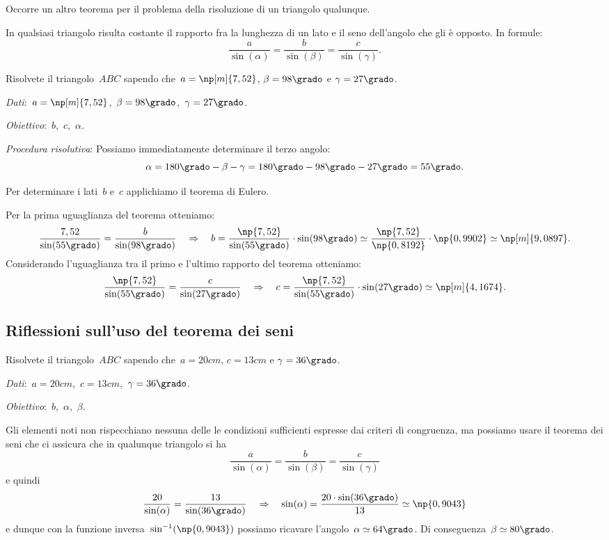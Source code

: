 Occorre un altro teorema per il problema della risoluzione di un triangolo qualunque.

\begin{teorema}
In qualsiasi triangolo risulta costante il rapporto fra la lunghezza di un lato e il seno dell'angolo che gli è opposto. In formule:
\[\frac{a}{\sin(\alpha)}=\frac{b}{\sin(\beta)}=\frac{c}{\sin(\gamma)}.\]
\end{teorema}

\begin{problema}
Risolvete il triangolo~$ABC$ sapendo che~$a= \np[m]{7,52}$, $\beta=98\grado$ e $\gamma=27\grado$.
\end{problema}

\emph{Dati}:~$a= \np[m]{7,52}$,\quad~$\beta=98\grado$,\quad~$\gamma=27\grado$.

\emph{Obiettivo}:~$b$,\quad~$c$,\quad~$\alpha$.

\emph{Procedura risolutiva}:
Possiamo immediatamente determinare il terzo angolo: \[\alpha=180\grado-\beta-\gamma=180\grado-98\grado-27\grado=55\grado.\]

Per determinare i lati~$b$ e~$c$ applichiamo il teorema di Eulero.

Per la prima uguaglianza del teorema otteniamo:
\[
\frac{7,52}{\sin(55\grado)}=\frac{b}{\sin(98\grado)} \quad\Rightarrow\quad b=\frac{\np{7,52}}{\sin(55\grado)}\cdot \sin(98\grado)\simeq
\frac{\np{7,52}}{\np{0,8192}}\cdot \np{0,9902}\simeq\np[m]{9,0897}.
\]
Considerando l'uguaglianza tra il primo e l'ultimo rapporto del teorema otteniamo:
\[
\frac{\np{7,52}}{\sin(55\grado)}=\frac{c}{\sin(27\grado)} \quad\Rightarrow\quad c=\frac{\np{7,52}}{\sin(55\grado)}\cdot \sin(27\grado)\simeq\np[m]{4,1674}.
\]

\subsection{Riflessioni sull'uso del teorema dei seni}

\begin{problema}
Risolvete il triangolo~$ABC$ sapendo che~$a= 20\unit{cm}$, $c= 13\unit{cm}$ e $\gamma=36\grado$.
\end{problema}

\emph{Dati}:~$a=20\unit{cm}$,\quad~$c=13\unit{cm}$,\quad~$\gamma=36\grado$.

\emph{Obiettivo}:~$b$,\quad~$\alpha$,\quad~$\beta$.

Gli elementi noti non rispecchiano nessuna delle le condizioni sufficienti espresse dai criteri di congruenza, ma possiamo usare il teorema dei seni
che ci assicura che in qualunque triangolo si ha
 \[\frac{a}{\sin(\alpha)}=\frac{b}{\sin(\beta)}=\frac{c}{\sin(\gamma)}\]
e quindi
\[\frac{20}{\sin(\alpha)}=\frac{13}{\sin(36\grado)}\quad\Rightarrow\quad\sin(\alpha)=\frac{20\cdot\sin(36\grado)}{13}\simeq \np{0,9043}\]
e dunque con la funzione inversa~$\sin^{-1}(\np{0,9043})$ possiamo ricavare l'angolo~$\alpha\simeq 64\grado$. Di conseguenza~$\beta\simeq 80\grado$.

